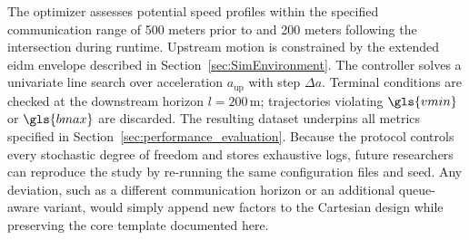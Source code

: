 The optimizer assesses potential speed profiles within the specified communication range of 500 meters prior to and 200 meters following the intersection during runtime. Upstream motion is constrained by the extended \ac{eidm} envelope described in Section~\ref{sec:SimEnvironment}. The controller solves a univariate line search over acceleration \(a_{\text{up}}\) with step \(\Delta a\). Terminal conditions are checked at the downstream horizon \(l=200\,\mathrm{m}\); trajectories violating \(\gls{vmin}\) or \(\gls{bmax}\) are discarded. 
\mynewline
The resulting dataset underpins all metrics specified in Section~\ref{sec:performance_evaluation}. Because the protocol controls every stochastic degree of freedom and stores exhaustive logs, future researchers can reproduce the study by re-running the same configuration files and seed. Any deviation, such as a different communication horizon or an additional queue-aware variant, would simply append new factors to the Cartesian design while preserving the core template documented here.

